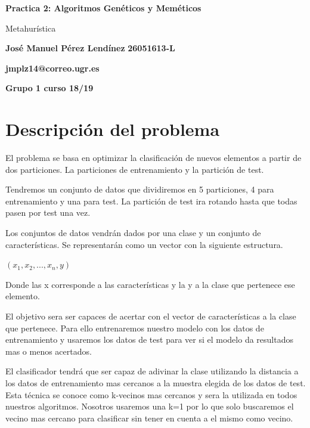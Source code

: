 \documentclass[titlepage]{article}
\begin{document}
	\begin{titlepage}
		\begin{center}
			\vspace*{1cm}
			\date{} %
			\Huge
			\textbf{Practica 2: Algoritmos Genéticos y Meméticos}
			
			\vspace{0.5cm}
			\LARGE
			Metahurística
			
			\vspace{1.5cm}
			
			\textbf{José Manuel Pérez Lendínez}
			\textbf{26051613-L}\newline
			
			\textbf{jmplz14@correo.ugr.es}		

					
			\textbf{Grupo 1 curso 18/19}
			

			
		\end{center}
	\newpage
	\tableofcontents
	\newpage
	\end{titlepage}
	\section{Descripción del problema}
	 El problema se basa en optimizar la clasificación de nuevos elementos a partir de dos particiones. La particiones de entrenamiento y la partición de test.
	 
	Tendremos un conjunto de datos que dividiremos en 5 particiones, 4 para entrenamiento y una para test. La partición de test ira rotando hasta que todas pasen por test una vez. 
	
	Los conjuntos de datos vendrán dados por una clase y un conjunto de características. Se representarán como un vector con la siguiente estructura.
	\begin{center}
		$(x_1, x_2, ... , x_n, y)$
	\end{center}

	Donde las x corresponde a las características y la y a la clase que pertenece ese elemento.
	
	El objetivo sera ser capaces de acertar con el vector de características a la clase que pertenece. Para ello entrenaremos nuestro modelo con los datos de entrenamiento y usaremos los datos de test para ver si el modelo da resultados mas o menos acertados.
	
	El clasificador tendrá que ser capaz de adivinar la clase utilizando la distancia a los datos de entrenamiento mas cercanos a la muestra elegida de los datos de test. Esta técnica se conoce como k-vecinos mas cercanos y sera la utilizada en todos nuestros algoritmos. Nosotros usaremos una k=1 por lo que solo buscaremos el vecino mas cercano para clasificar sin tener en cuenta a el mismo como vecino.
	
\end{document}
